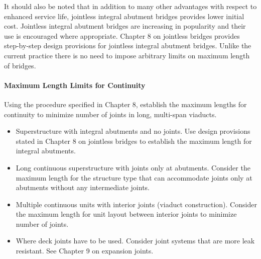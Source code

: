 It should also be noted that in addition to many other advantages with respect to enhanced service life, jointless
integral abutment bridges provides lower initial cost. Jointless integral abutment bridges are increasing in popularity
and their use is encouraged where appropriate. Chapter 8 on jointless bridges provides step-by-step design provisions
for jointless integral abutment bridges. Unlike the current practice there is no need to impose arbitrary limits on
maximum length of bridges.

\paragraph{Maximum Length Limits for Continuity}
Using the procedure specified in Chapter 8, establish the maximum lengths for continuity to minimize number of
joints in long, multi-span viaducts.
\begin{itemize}
  \item Superstructure with integral abutments and no joints. Use design provisions stated in Chapter 8 on jointless
  bridges to establish the maximum length for integral abutments.
  \item  Long continuous superstructure with joints only at abutments. Consider the maximum length for the
  structure type that can accommodate joints only at abutments without any intermediate joints.
  \item Multiple continuous units with interior joints (viaduct construction). Consider the maximum length for unit
  layout between interior joints to minimize number of joints.
  \item Where deck joints have to be used. Consider joint systems that are more leak resistant. See Chapter 9 on
  expansion joints.
\end{itemize}

